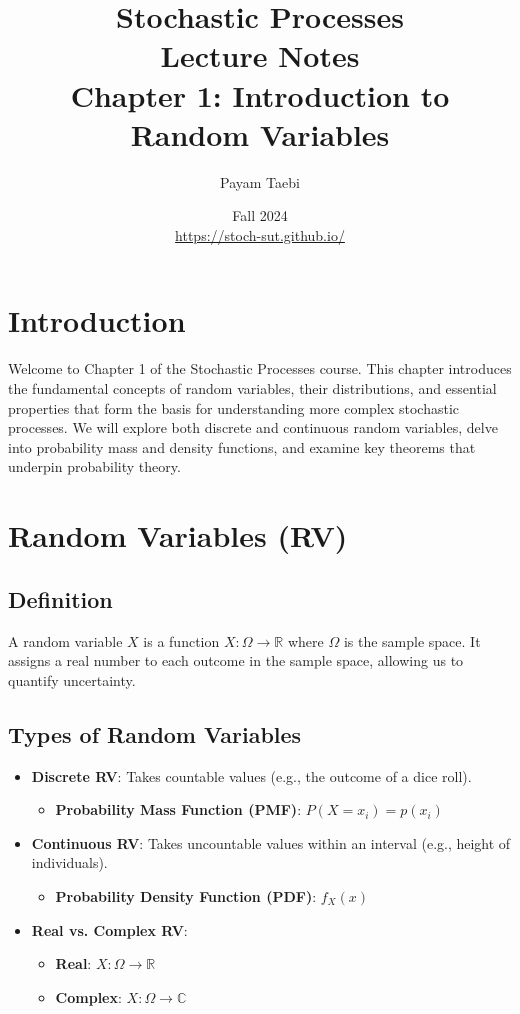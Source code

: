 \documentclass[12pt]{article}
\title{
    \vspace{-2cm}
    \LARGE{Stochastic Processes} \\
    \vspace{0.5cm}
    \Large{Lecture Notes} \\
    \vspace{0.5cm}
    \normalsize{Chapter 1: Introduction to Random Variables}
}
\author{
    Payam Taebi \\
    \vspace{0.2cm}
}
\date{
    Fall 2024 \\
    \vspace{0.2cm}
    \href{https://stoch-sut.github.io/}{https://stoch-sut.github.io/}
}
\begin{document}
\maketitle
\tableofcontents
\newpage

\section{Introduction}
Welcome to Chapter 1 of the Stochastic Processes course. This chapter introduces the fundamental concepts of random variables, their distributions, and essential properties that form the basis for understanding more complex stochastic processes. We will explore both discrete and continuous random variables, delve into probability mass and density functions, and examine key theorems that underpin probability theory.

\section{Random Variables (RV)}
\subsection{Definition}
A random variable \( X \) is a function \( X: \Omega \rightarrow \mathbb{R} \) where \( \Omega \) is the sample space. It assigns a real number to each outcome in the sample space, allowing us to quantify uncertainty.

\subsection{Types of Random Variables}
\begin{itemize}
    \item \textbf{Discrete RV}: Takes countable values (e.g., the outcome of a dice roll).
        \begin{itemize}
            \item \textbf{Probability Mass Function (PMF)}: \( P(X = x_i) = p(x_i) \)
        \end{itemize}
    \item \textbf{Continuous RV}: Takes uncountable values within an interval (e.g., height of individuals).
        \begin{itemize}
            \item \textbf{Probability Density Function (PDF)}: \( f_X(x) \)
        \end{itemize}
    \item \textbf{Real vs. Complex RV}:
        \begin{itemize}
            \item \textbf{Real}: \( X: \Omega \rightarrow \mathbb{R} \)
            \item \textbf{Complex}: \( X: \Omega \rightarrow \mathbb{C} \)
        \end{itemize}
\end{itemize}
\end{document}
